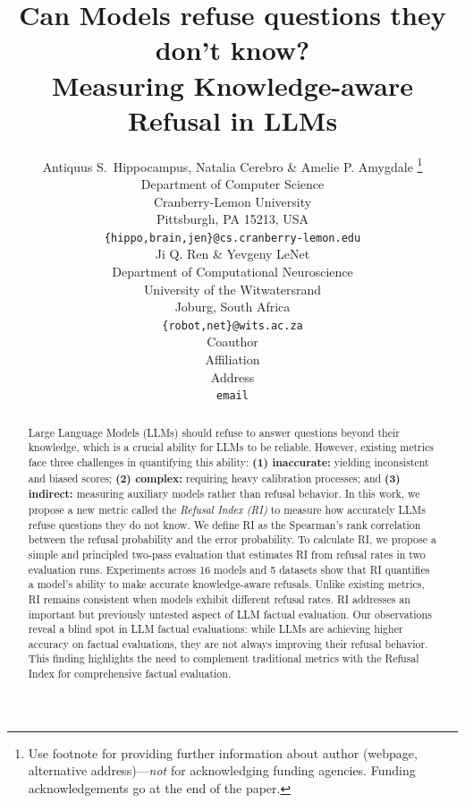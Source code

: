\documentclass{article} %
\title{Can Models refuse questions they don't know? \\ Measuring Knowledge-aware Refusal in LLMs}
\author{Antiquus S.~Hippocampus, Natalia Cerebro \& Amelie P. Amygdale \thanks{ Use footnote for providing further information
about author (webpage, alternative address)---\emph{not} for acknowledging
funding agencies.  Funding acknowledgements go at the end of the paper.} \\
Department of Computer Science\\
Cranberry-Lemon University\\
Pittsburgh, PA 15213, USA \\
\texttt{\{hippo,brain,jen\}@cs.cranberry-lemon.edu} \\
\And
Ji Q. Ren \& Yevgeny LeNet \\
Department of Computational Neuroscience \\
University of the Witwatersrand \\
Joburg, South Africa \\
\texttt{\{robot,net\}@wits.ac.za} \\
\AND
Coauthor \\
Affiliation \\
Address \\
\texttt{email}
}
\theoremstyle{definition}
\begin{document}
\maketitle

\begin{abstract}
Large Language Models (LLMs) should refuse to answer questions beyond their knowledge, which is a crucial ability for LLMs to be reliable. 
However, existing metrics face three challenges in quantifying this ability: 
\textbf{(1) inaccurate:} yielding inconsistent and biased scores; 
\textbf{(2) complex:} requiring heavy calibration processes; 
and \textbf{(3) indirect:} measuring auxiliary models rather than refusal behavior. 
In this work, we propose a new metric called the \emph{Refusal Index (RI)} to measure how accurately LLMs refuse questions they do not know. 
We define RI as the Spearman's rank correlation between the refusal probability and the error probability. 
To calculate RI, we propose a simple and principled two-pass evaluation that estimates RI from refusal rates in two evaluation runs. 
Experiments across 16 models and 5 datasets show that RI quantifies a model's ability to make accurate knowledge-aware refusals. Unlike existing metrics, RI remains consistent when models exhibit different refusal rates.
RI addresses an important but previously untested aspect of LLM factual evaluation. 
Our observations reveal a blind spot in LLM factual evaluations: 
while LLMs are achieving higher accuracy on factual evaluations, they are not always improving their refusal behavior. 
This finding highlights the need to complement traditional metrics with the Refusal Index for comprehensive factual evaluation.

\end{abstract}

















\end{document}
